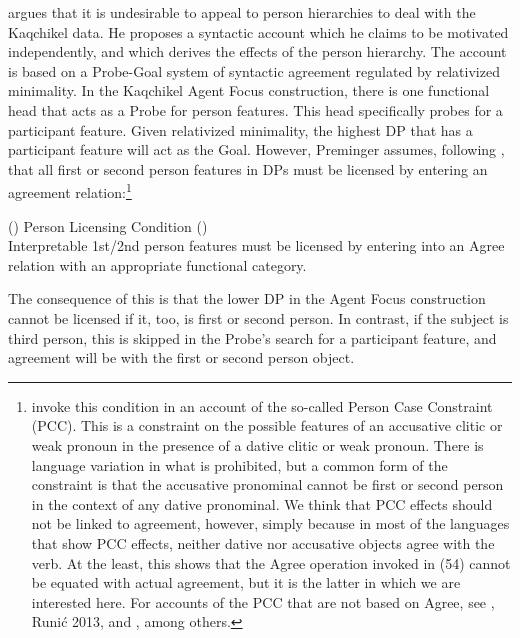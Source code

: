 \documentclass[output=paper]{langsci/langscibook}
\begin{document}
\citet{Preminger2014} argues that it is undesirable to appeal to person hierarchies to deal with the Kaqchikel data. He proposes a syntactic account which he claims to be motivated independently, and which derives the effects of the person hierarchy. The account is based on a Probe-Goal system of syntactic agreement regulated by relativized minimality. In the Kaqchikel Agent Focus construction, there is one functional head that acts as a Probe for person features. This head specifically probes for a participant feature. Given relativized minimality, the highest DP that has a participant feature will act as the Goal. However, Preminger assumes, following \citet{Bejar2003}, that all first or second person features in DPs must be licensed by entering an agreement relation:\footnote{\citet{Bejar2003} invoke this condition in an account of the so-called Person Case Constraint (PCC). This is a constraint on the possible features of an accusative clitic or weak pronoun in the presence of a dative clitic or weak pronoun. There is language variation in what is prohibited, but a common form of the constraint is that the accusative pronominal cannot be first or second person in the context of any dative pronominal. We think that PCC effects should not be linked to agreement, however, simply because in most of the languages that show PCC effects, neither dative nor accusative objects agree with the verb. At the least, this shows that the Agree operation invoked in (54) cannot be equated with actual agreement, but it is the latter in which we are interested here. For accounts of the PCC that are not based on Agree, see \citealt{Haspelmath2004}, Runić 2013, and \citealt{Kiss2015}, among others.}

\ea (\label{bkm:Ref454187927})  Person Licensing Condition (\citealt{Bejar2003})\\
Interpretable 1st/2nd person features must be licensed by entering into an Agree relation with an appropriate functional category.
\z

The consequence of this is that the lower DP in the Agent Focus construction cannot be licensed if it, too, is first or second person. In contrast, if the subject is third person, this is skipped in the Probe’s search for a participant feature, and agreement will be with the first or second person object.
\end{document}

